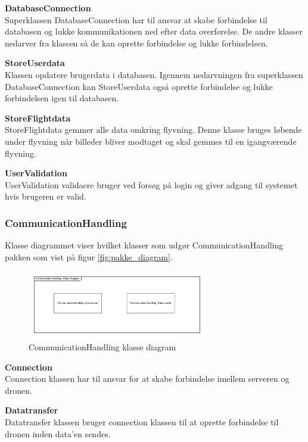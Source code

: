 \textbf{DatabaseConnection}\\
Superklassen DatabaseConnection har til ansvar at skabe forbindelse til databasen og lukke kommunikationen ned efter data overførelse. De andre klasser nedarver fra klassen så de kan oprette forbindelse og lukke forbindelsen.

\textbf{StoreUserdata}\\
Klassen opdatere brugerdata i databasen. Igennem nedarvningen fra superklassen DatabaseConnection kan StoreUserdata også oprette forbindelse og lukke forbindelsen igen til databasen.

\textbf{StoreFlightdata}\\
StoreFlightdata gemmer alle data omkring flyvning. Denne klasse bruges løbende under flyvning når billeder bliver modtaget og skal gemmes til en igangværende flyvning.

\textbf{UserValidation}\\
UserValidation validaere bruger ved forsøg på login og giver adgang til systemet hvis brugeren er valid.

\newpage
\subsubsection*{CommunicationHandling}
Klasse diagrammet viser hvilket klasser som udgør CommunicationHandling pakken som vist på figur \ref{fig:pakke_diagram}.

\vspace{-5pt}
\begin{figure}[H]
	\centering
	\includegraphics[width=0.7\textwidth]{Billeder/klasse_diagrammer/CommunicationHandling.png}
	\vspace{-5pt}
	\caption{CommunicationHandling klasse diagram}
	\label{fig:CommunicationHandling_klasse_diagram}
\end{figure}

\textbf{Connection}\\
Connection klassen har til ansvar for at skabe forbindelse imellem serveren og dronen.

\textbf{Datatransfer}\\
Datatransfer klassen bruger connection klassen til at oprette forbindelse til dronen inden data'en sendes. 
